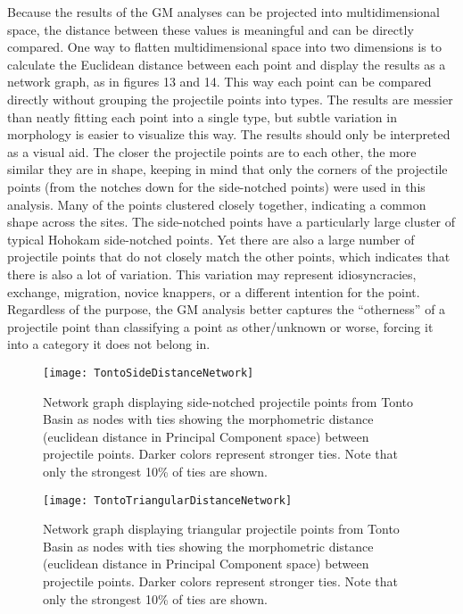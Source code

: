 \documentclass[PCJ,Unicode,screen,mode=plain]{cedram}
\begin{document}
Because the results of the GM analyses can be projected into multidimensional space, the distance between these values is meaningful and can be directly compared. One way to flatten multidimensional space into two dimensions is to calculate the Euclidean distance between each point and display the results as a network graph, as in figures 13 and 14. This way each point can be compared directly without grouping the projectile points into types. The results are messier than neatly fitting each point into a single type, but subtle variation in morphology is easier to visualize this way. The results should only be interpreted as a visual aid. The closer the projectile points are to each other, the more similar they are in shape, keeping in mind that only the corners of the projectile points (from the notches down for the side-notched points) were used in this analysis. Many of the points clustered closely together, indicating a common shape across the sites. The side-notched points have a particularly large cluster of typical Hohokam side-notched points. Yet there are also a large number of projectile points that do not closely match the other points, which indicates that there is also a lot of variation. This variation may represent idiosyncracies, exchange, migration, novice knappers, or a different intention for the point. Regardless of the purpose, the GM analysis better captures the ``otherness'' of a projectile point than classifying a point as other/unknown or worse, forcing it into a category it does not belong in.

\begin{figure}
\texttt{[image: TontoSideDistanceNetwork]} \caption{Network graph displaying side-notched projectile points from Tonto Basin as nodes with ties showing the morphometric distance (euclidean distance in Principal Component space) between projectile points. Darker colors represent stronger ties. Note that only the strongest 10\% of ties are shown.}\label{fig:TontoSideDistanceNetwork}
\end{figure}

\begin{figure}
\texttt{[image: TontoTriangularDistanceNetwork]} \caption{Network graph displaying triangular projectile points from Tonto Basin as nodes with ties showing the morphometric distance (euclidean distance in Principal Component space) between projectile points. Darker colors represent stronger ties. Note that only the strongest 10\% of ties are shown.}\label{fig:TontoTriangularDistanceNetwork}
\end{figure}
\end{document}
